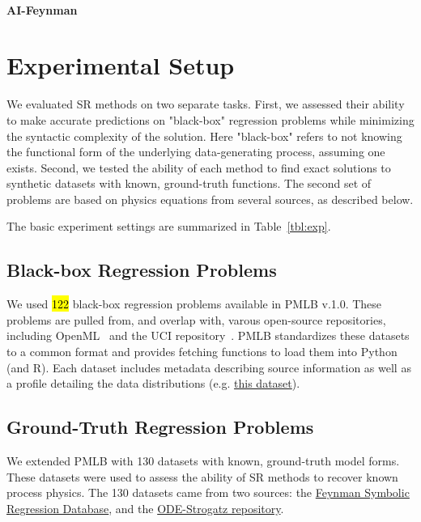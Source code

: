 \paragraph{AI-Feynman}

\section{Experimental Setup}

We evaluated SR methods on two separate tasks. 
First, we assessed their ability to make accurate predictions on "black-box" regression problems while minimizing the syntactic complexity of the solution. 
Here "black-box" refers to not knowing the functional form of the underlying data-generating process, assuming one exists.   
Second, we tested the ability of each method to find exact solutions to synthetic datasets with known, ground-truth functions. 
The second set of problems are based on physics equations from several sources, as described below. 

The basic experiment settings are summarized in Table~\ref{tbl:exp}.



\subsection{Black-box Regression Problems}

We used \hl{122} black-box regression problems available in PMLB v.1.0. 
These problems are pulled from, and overlap with, varous open-source repositories, including OpenML~\cite{vanschorenOpenMLNetworkedScience2013} and the UCI repository~\cite{lichmanUCIMachineLearning2013a}. 
PMLB standardizes these datasets to a common format and provides fetching functions to load them into Python (and R). 
Each dataset includes metadata describing source information as well as a profile detailing the data distributions (e.g. \href{https://epistasislab.github.io/pmlb/profile/analcatdata_aids.html}{this dataset}).


\subsection{Ground-Truth Regression Problems}
We extended PMLB with 130 datasets with known, ground-truth model forms. 
These datasets were used to assess the ability of SR methods to recover known process physics. 
The 130 datasets came from two sources: the \href{https://space.mit.edu/home/tegmark/aifeynman.html}{Feynman Symbolic Regression Database}, 
and the \href{https://github.com/lacava/ode-strogatz}{ODE-Strogatz repository}.

